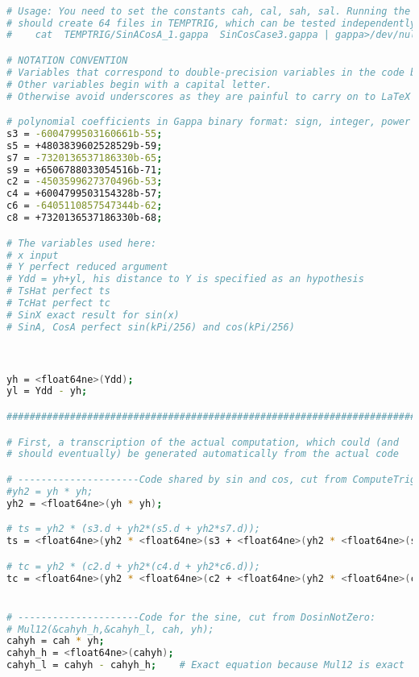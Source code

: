 \begin{lstlisting}[caption={Gappa input to compute the error of DoSineNotZero},
  language={sh}, numbers=none]

# Usage: You need to set the constants cah, cal, sah, sal. Running the trigo.mpl Maple script
# should create 64 files in TEMPTRIG, which can be tested independently as 
#    cat  TEMPTRIG/SinACosA_1.gappa  SinCosCase3.gappa | gappa>/dev/null

# NOTATION CONVENTION 
# Variables that correspond to double-precision variables in the code begin with a small letter
# Other variables begin with a capital letter.
# Otherwise avoid underscores as they are painful to carry on to LaTeX :)

# polynomial coefficients in Gappa binary format: sign, integer, power of two
s3 = -6004799503160661b-55;
s5 = +4803839602528529b-59;
s7 = -7320136537186330b-65;
s9 = +6506788033054516b-71;
c2 = -4503599627370496b-53;
c4 = +6004799503154328b-57;
c6 = -6405110857547344b-62;
c8 = +7320136537186330b-68;

# The variables used here:
# x input
# Y perfect reduced argument
# Ydd = yh+yl, his distance to Y is specified as an hypothesis 
# TsHat perfect ts
# TcHat perfect tc
# SinX exact result for sin(x)
# SinA, CosA perfect sin(kPi/256) and cos(kPi/256)



yh = <float64ne>(Ydd);
yl = Ydd - yh;

#######################################################################

# First, a transcription of the actual computation, which could (and
# should eventually) be generated automatically from the actual code

# ---------------------Code shared by sin and cos, cut from ComputeTrigWithArgRed : 
#yh2 = yh * yh; 
yh2 = <float64ne>(yh * yh);

# ts = yh2 * (s3.d + yh2*(s5.d + yh2*s7.d));
ts = <float64ne>(yh2 * <float64ne>(s3 + <float64ne>(yh2 * <float64ne>(s5 + <float64ne>(yh2 * s7)))));

# tc = yh2 * (c2.d + yh2*(c4.d + yh2*c6.d));
tc = <float64ne>(yh2 * <float64ne>(c2 + <float64ne>(yh2 * <float64ne>(c4 + <float64ne>(yh2 * c6)))));


# ---------------------Code for the sine, cut from DosinNotZero: 
# Mul12(&cahyh_h,&cahyh_l, cah, yh);
cahyh = cah * yh;
cahyh_h = <float64ne>(cahyh);
cahyh_l = cahyh - cahyh_h;    # Exact equation because Mul12 is exact


\end{lstlisting}
